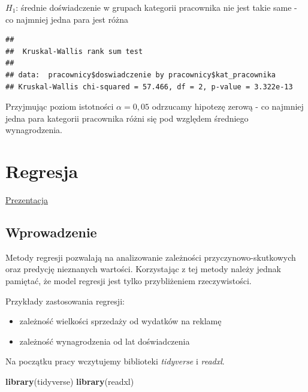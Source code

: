 \documentclass[
]{book}
\newenvironment{Shaded}{\begin{snugshade}}{\end{snugshade}}
\newcommand{\KeywordTok}[1]{\textcolor[rgb]{0.13,0.29,0.53}{\textbf{#1}}}
\newcommand{\NormalTok}[1]{#1}
\newcommand{\OperatorTok}[1]{\textcolor[rgb]{0.81,0.36,0.00}{\textbf{#1}}}
\newcommand{\StringTok}[1]{\textcolor[rgb]{0.31,0.60,0.02}{#1}}
\begin{document}
\(H_1\): średnie doświadczenie w grupach kategorii pracownika nie jest takie same - co najmniej jedna para jest różna

\begin{Shaded}
\end{Shaded}

\begin{verbatim}
## 
##  Kruskal-Wallis rank sum test
## 
## data:  pracownicy$doswiadczenie by pracownicy$kat_pracownika
## Kruskal-Wallis chi-squared = 57.466, df = 2, p-value = 3.322e-13
\end{verbatim}

Przyjmując poziom istotności \(\alpha = 0,05\) odrzucamy hipotezę zerową - co najmniej jedna para kategorii pracownika różni się pod względem średniego wynagrodzenia.

\hypertarget{regresja}{%
\chapter{Regresja}\label{regresja}}

\href{presentations/04_regresja.html}{Prezentacja}

\hypertarget{wprowadzenie-2}{%
\section{Wprowadzenie}\label{wprowadzenie-2}}

Metody regresji pozwalają na analizowanie zależności przyczynowo-skutkowych oraz predycję nieznanych wartości. Korzystając z tej metody należy jednak pamiętać, że model regresji jest tylko przybliżeniem rzeczywistości.

Przykłady zastosowania regresji:

\begin{itemize}
\item
  zależność wielkości sprzedaży od wydatków na reklamę
\item
  zależność wynagrodzenia od lat doświadczenia
\end{itemize}

Na początku pracy wczytujemy biblioteki \emph{tidyverse} i \emph{readxl}.

\begin{Shaded}
\begin{Highlighting}[]
\KeywordTok{library}\NormalTok{(tidyverse)}
\KeywordTok{library}\NormalTok{(readxl)}
\end{Highlighting}
\end{Shaded}
\end{document}
